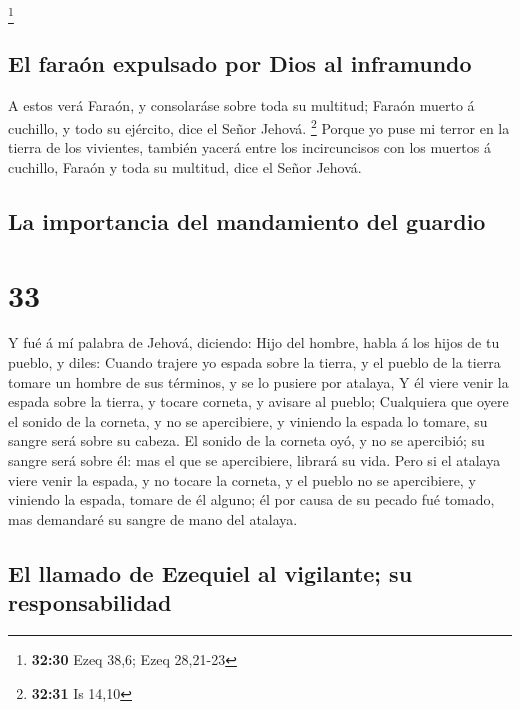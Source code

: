 \footnote{\textbf{32:30} Ezeq 38,6; Ezeq 28,21-23}

\hypertarget{el-farauxf3n-expulsado-por-dios-al-inframundo}{%
\subsection{El faraón expulsado por Dios al
inframundo}\label{el-farauxf3n-expulsado-por-dios-al-inframundo}}

 A estos verá Faraón, y consolaráse sobre toda su multitud;
Faraón muerto á cuchillo, y todo su ejército, dice el Señor Jehová.
\footnote{\textbf{32:31} Is 14,10}  Porque yo puse mi
terror en la tierra de los vivientes, también yacerá entre los
incircuncisos con los muertos á cuchillo, Faraón y toda su multitud,
dice el Señor Jehová.

\hypertarget{la-importancia-del-mandamiento-del-guardio}{%
\subsection{La importancia del mandamiento del
guardio}\label{la-importancia-del-mandamiento-del-guardio}}

\hypertarget{section-32}{%
\section{33}\label{section-32}}

 Y fué á mí palabra de Jehová, diciendo:  Hijo
del hombre, habla á los hijos de tu pueblo, y diles: Cuando trajere yo
espada sobre la tierra, y el pueblo de la tierra tomare un hombre de sus
términos, y se lo pusiere por atalaya,  Y él viere venir la
espada sobre la tierra, y tocare corneta, y avisare al pueblo;
 Cualquiera que oyere el sonido de la corneta, y no se
apercibiere, y viniendo la espada lo tomare, su sangre será sobre su
cabeza.  El sonido de la corneta oyó, y no se apercibió; su
sangre será sobre él: mas el que se apercibiere, librará su vida.
 Pero si el atalaya viere venir la espada, y no tocare la
corneta, y el pueblo no se apercibiere, y viniendo la espada, tomare de
él alguno; él por causa de su pecado fué tomado, mas demandaré su sangre
de mano del atalaya.

\hypertarget{el-llamado-de-ezequiel-al-vigilante-su-responsabilidad}{%
\subsection{El llamado de Ezequiel al vigilante; su
responsabilidad}\label{el-llamado-de-ezequiel-al-vigilante-su-responsabilidad}}

